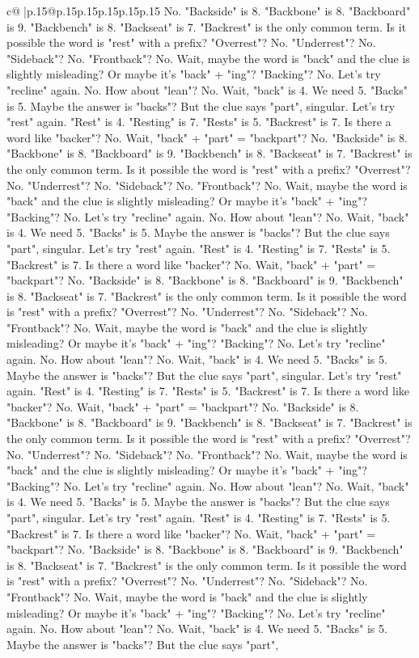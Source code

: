 \documentclass{article}
\begin{document}
{\begin{supertabular}{c@{$\;$}|p{.15\linewidth}@{}p{.15\linewidth}p{.15\linewidth}p{.15\linewidth}p{.15\linewidth}p{.15\linewidth}}
{{{No. "Backside" is 8. "Backbone" is 8. "Backboard" is 9. "Backbench" is 8. "Backseat" is 7. "Backrest" is the only common term. Is it possible the word is "rest" with a prefix? "Overrest"? No. "Underrest"? No. "Sideback"? No. "Frontback"? No. Wait, maybe the word is "back" and the clue is slightly misleading? Or maybe it's "back" + "ing"? "Backing"? No. Let's try "recline" again. No. How about "lean"? No. Wait, "back" is 4. We need 5. "Backs" is 5. Maybe the answer is "backs"? But the clue says "part", singular. Let's try "rest" again. "Rest" is 4. "Resting" is 7. "Rests" is 5. "Backrest" is 7. Is there a word like "backer"? No. Wait, "back" + "part" = "backpart"? No. "Backside" is 8. "Backbone" is 8. "Backboard" is 9. "Backbench" is 8. "Backseat" is 7. "Backrest" is the only common term. Is it possible the word is "rest" with a prefix? "Overrest"? No. "Underrest"? No. "Sideback"? No. "Frontback"? No. Wait, maybe the word is "back" and the clue is slightly misleading? Or maybe it's "back" + "ing"? "Backing"? No. Let's try "recline" again. No. How about "lean"? No. Wait, "back" is 4. We need 5. "Backs" is 5. Maybe the answer is "backs"? But the clue says "part", singular. Let's try "rest" again. "Rest" is 4. "Resting" is 7. "Rests" is 5. "Backrest" is 7. Is there a word like "backer"? No. Wait, "back" + "part" = "backpart"? No. "Backside" is 8. "Backbone" is 8. "Backboard" is 9. "Backbench" is 8. "Backseat" is 7. "Backrest" is the only common term. Is it possible the word is "rest" with a prefix? "Overrest"? No. "Underrest"? No. "Sideback"? No. "Frontback"? No. Wait, maybe the word is "back" and the clue is slightly misleading? Or maybe it's "back" + "ing"? "Backing"? No. Let's try "recline" again. No. How about "lean"? No. Wait, "back" is 4. We need 5. "Backs" is 5. Maybe the answer is "backs"? But the clue says "part", singular. Let's try "rest" again. "Rest" is 4. "Resting" is 7. "Rests" is 5. "Backrest" is 7. Is there a word like "backer"? No. Wait, "back" + "part" = "backpart"? No. "Backside" is 8. "Backbone" is 8. "Backboard" is 9. "Backbench" is 8. "Backseat" is 7. "Backrest" is the only common term. Is it possible the word is "rest" with a prefix? "Overrest"? No. "Underrest"? No. "Sideback"? No. "Frontback"? No. Wait, maybe the word is "back" and the clue is slightly misleading? Or maybe it's "back" + "ing"? "Backing"? No. Let's try "recline" again. No. How about "lean"? No. Wait, "back" is 4. We need 5. "Backs" is 5. Maybe the answer is "backs"? But the clue says "part", singular. Let's try "rest" again. "Rest" is 4. "Resting" is 7. "Rests" is 5. "Backrest" is 7. Is there a word like "backer"? No. Wait, "back" + "part" = "backpart"? No. "Backside" is 8. "Backbone" is 8. "Backboard" is 9. "Backbench" is 8. "Backseat" is 7. "Backrest" is the only common term. Is it possible the word is "rest" with a prefix? "Overrest"? No. "Underrest"? No. "Sideback"? No. "Frontback"? No. Wait, maybe the word is "back" and the clue is slightly misleading? Or maybe it's "back" + "ing"? "Backing"? No. Let's try "recline" again. No. How about "lean"? No. Wait, "back" is 4. We need 5. "Backs" is 5. Maybe the answer is "backs"? But the clue says "part", }}}
\end{supertabular}}
\end{document}
